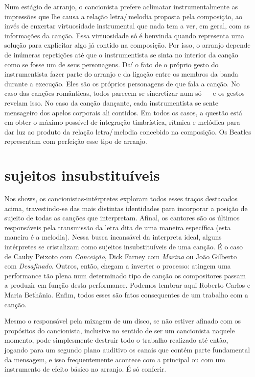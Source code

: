 Num estágio de arranjo, o cancionista prefere aclimatar
instrumentalmente as impressões que lhe causa a relação letra/\,melodia
proposta pela composição, ao invés de enxertar virtuosidade
instrumental que nada tem a ver, em geral, com as informações da canção.
Essa virtuosidade só é benvinda quando representa uma solução para
explicitar algo já contido na composição. Por isso, o arranjo depende de
inúmeras repetições até que o instrumentista se sinta no interior da
canção como se fosse um de seus personagens. Daí o fato de o próprio
gesto do instrumentista fazer parte do arranjo e da ligação entre os
membros da banda durante a execução. Eles são os próprios personagens de
que fala a canção. No caso das canções românticas, todos parecem se
sincretizar num só --- e os gestos revelam isso. No caso da canção
dançante, cada instrumentista se sente mensageiro dos apelos corporais
ali contidos. Em todos os casos, a questão está em obter o máximo
possível de integração timbrística, rítmica e melódica para dar luz ao
produto da relação letra/\,melodia concebido na composição. Os Beatles
representam com perfeição esse tipo de arranjo.

\section{sujeitos insubstituíveis}

Nos shows, os cancionistas-intérpretes exploram todos esses traços
destacados acima, travestindo-se das mais distintas identidades para
incorporar a posição de sujeito de todas as canções que interpretam.
Afinal, os cantores são os últimos responsáveis pela transmissão da
letra dita de uma maneira específica (esta maneira é a melodia). Nessa
busca incansável da interpreta ideal, alguns intérpretes se cristalizam
como sujeitos insubstituíveis de uma canção. É o caso de Cauby Peixoto
com \emph{Conceição}, Dick Farney com \emph{Marina} ou João Gilberto com
\emph{Desafinado}. Outros, então, chegam a inverter o processo: atingem
uma performance tão plena num determinado tipo de canção os compositores
passam a produzir em função desta performance. Podemos lembrar aqui
Roberto Carlos e Maria Bethânia. Enfim, todos esses são fatos
consequentes de um trabalho com a canção.

Mesmo o responsável pela mixagem de um disco, se não estiver afinado com
os propósitos do cancionista, inclusive no sentido de ser um cancionista
naquele momento, pode simplesmente destruir todo o trabalho realizado
até então, jogando para um segundo plano auditivo os canais que contém
parte fundamental da mensagem, e isso frequentemente acontece com a
principal ou com um instrumento de efeito básico no arranjo. É só
conferir.

